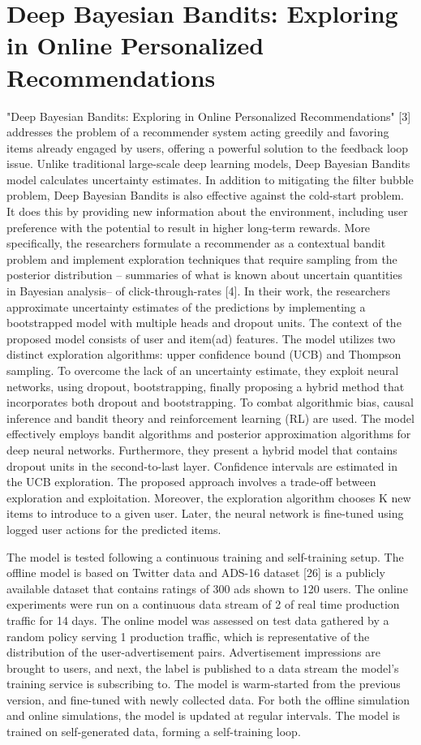 \section{Deep Bayesian Bandits: Exploring in Online Personalized
Recommendations}
"Deep Bayesian Bandits: Exploring in  Online Personalized Recommendations" [3] addresses the problem of a recommender system acting greedily and favoring items already engaged by users, offering a powerful solution to the feedback loop issue. Unlike traditional large-scale deep learning models, Deep Bayesian Bandits model calculates uncertainty estimates. In addition to mitigating the filter bubble problem, Deep Bayesian Bandits is also effective against the cold-start problem. It does this by providing new information about the environment, including user preference with the potential to result in  higher long-term rewards. More specifically, the researchers formulate a recommender as a contextual bandit problem and implement exploration techniques that require sampling from the posterior distribution -- summaries of what is known about uncertain quantities in Bayesian analysis-- of click-through-rates [4]. In their work, the researchers approximate uncertainty estimates of the predictions by implementing a bootstrapped model with multiple heads and dropout units. The context of the proposed model consists of user and item(ad) features. The model utilizes two distinct exploration algorithms: upper confidence bound (UCB) and Thompson sampling. To overcome the lack of an uncertainty estimate, they exploit neural networks, using dropout, bootstrapping, finally proposing a hybrid method that incorporates both dropout and bootstrapping. 
To combat algorithmic bias, causal inference and bandit theory and reinforcement learning (RL) are used. The model effectively employs bandit algorithms and posterior approximation algorithms for deep neural networks. Furthermore, they present a hybrid model that contains dropout units in the second-to-last layer. Confidence intervals are estimated in the UCB exploration. 
The proposed approach involves a trade-off between exploration and exploitation. Moreover, the exploration algorithm chooses K new items to introduce to a given user. Later, the neural network is fine-tuned using logged user actions for the predicted items. 

The model is tested following a continuous training and self-training setup. The offline model is based on Twitter data and ADS-16 dataset [26] is a publicly available dataset
that contains ratings of 300 ads shown to 120 users. The online experiments were run on a continuous data stream of 2\text{\%} of real time production traffic for 14 days. The online model was assessed on test data gathered by a random policy serving 1\text{\%} production traffic, which is representative of the distribution of the user-advertisement pairs.  Advertisement impressions are brought to users, and next, the label is published to a data stream the model’s training service is subscribing to. The model is warm-started from the previous version, and fine-tuned with newly collected data. For both the offline simulation and online simulations, the model is updated at regular intervals. The model is trained on self-generated data, forming a self-training loop.

